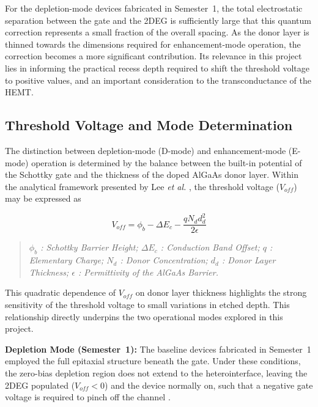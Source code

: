 For the depletion-mode devices fabricated in Semester~1, the total
electrostatic separation between the gate and the 2DEG is sufficiently
large that this quantum correction represents a small fraction of the
overall spacing. As the donor layer is thinned towards the dimensions
required for enhancement-mode operation, the correction becomes a more
significant contribution. Its relevance in this project lies in
informing the practical recess depth required to shift the threshold
voltage to positive values, and an important consideration to the 
transconductance of the HEMT.

\subsection{Threshold Voltage and Mode Determination}

The distinction between depletion-mode (D-mode) and enhancement-mode
(E-mode) operation is determined by the balance between the built-in
potential of the Schottky gate and the thickness of the doped AlGaAs
donor layer. Within the analytical framework presented by Lee
\textit{et al.} \cite{ivcv-hemt}, the threshold voltage ($V_{off}$) may
be expressed as

\begin{equation}
    V_{off} = \phi_b - \Delta E_c - \frac{q N_d d_d^2}{2\epsilon}
    \label{equation:threshold_voltage}
\end{equation}

\begin{quote}
    \footnotesize
    \textit{$\phi_b$ : Schottky Barrier Height; $\Delta E_c$ : Conduction Band Offset; 
    $q$ : Elementary Charge; $N_d$ : Donor Concentration; $d_d$ : Donor Layer Thickness; 
    $\epsilon$ : Permittivity of the AlGaAs Barrier.}
    
\end{quote}

\vspace{2mm}

This quadratic dependence of $V_{off}$ on donor layer thickness
highlights the strong sensitivity of the threshold voltage to small
variations in etched depth. This relationship directly underpins the two
operational modes explored in this project.

\vspace{2mm}

\textbf{Depletion Mode (Semester~1):}  
The baseline devices fabricated in Semester~1 employed the full
epitaxial structure beneath the gate. Under these conditions, the
zero-bias depletion region does not extend to the heterointerface,
leaving the 2DEG populated ($V_{off} < 0$) and the device normally on,
such that a negative gate voltage is required to pinch off the channel
\cite{Mimura1980}.

